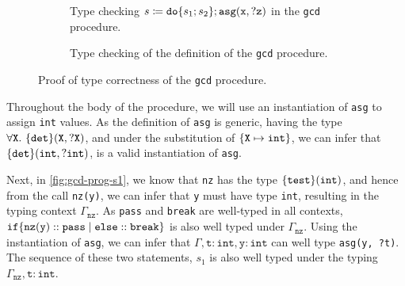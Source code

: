 \begin{figure}[ht]
  \vspace{1em}
  \begin{subfigure}{\textwidth}
    \begin{prooftree}
    \end{prooftree}
    \caption{Type checking $s \coloneqq \mathtt{do}\set{s_1;s_2};\mathtt{asg(x, ?z)}$ in the \texttt{gcd} procedure.}
    \label{fig:gcd-prog-s}
  \end{subfigure}
  
  \vspace{1em}
  \begin{subfigure}{\textwidth}
    \begin{prooftree}
    \end{prooftree}
    \caption{Type checking of the definition of the \texttt{gcd} procedure.}
    \label{fig:gcd-prog-def}
  \end{subfigure}
  \caption{Proof of type correctness of the \texttt{gcd} procedure.}
  \label{fig:gcd-type-proof}
\end{figure}

Throughout the body of the procedure, we will use an instantiation of \texttt{asg} to assign \texttt{int} values. As the definition of \texttt{asg} is generic, having the type $\forall \mathtt{X}.\ \set{\texttt{det}}(\mathtt{X}, ?\mathtt{X})$, and under the substitution of $\set{\mathtt{X}\mapsto \mathtt{int}}$, we can infer that $\set{\texttt{det}}(\mathtt{int}, ?\mathtt{int})$, is a valid instantiation of \texttt{asg}. 

Next, in \cref{fig:gcd-prog-s1}, we know that \texttt{nz} has the type $\set{\texttt{test}}(\mathtt{int})$, and hence from the call \texttt{nz(y)}, we can infer that \texttt{y} must have type \texttt{int}, resulting in the typing context $\Gamma_{\mathtt{nz}}$. As \texttt{pass} and \texttt{break} are well-typed in all contexts, $\mathtt{if \set{ nz(y) :: pass \mid else :: break }}$ is also well typed under $\Gamma_{\mathtt{nz}}$. Using the instantiation of \texttt{asg}, we can infer that $\Gamma,\mathtt{t}:\mathtt{int},\mathtt{y}:\mathtt{int}$ can well type \texttt{asg(y, ?t)}. The sequence of these two statements, $s_1$ is also well typed under the typing $\Gamma_{\mathtt{nz}},\mathtt{t}:\mathtt{int}$.

